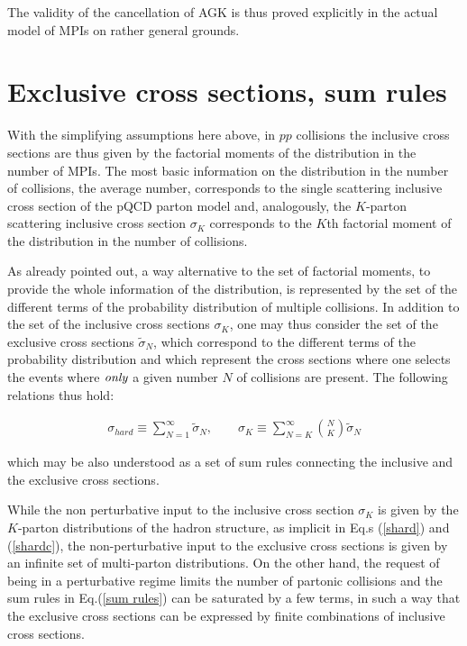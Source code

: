 \documentclass{ws-rv9x6}
\begin{document}
The validity of the cancellation of AGK\cite{Abramovsky:1973fm} is thus proved explicitly in the actual model of MPIs on rather general grounds.

\section{Exclusive cross sections, sum rules}

With the simplifying assumptions here above, in $pp$ collisions the inclusive cross sections are thus given by the factorial moments of the
distribution in the number of MPIs. The most basic information on the distribution in the number of collisions, the average number, corresponds to the
single scattering inclusive cross section of the pQCD parton model and, analogously, the $K$-parton scattering inclusive cross
section $\sigma_K$ corresponds to the $K$th factorial moment of the distribution in the number
of collisions. 

As already pointed out, a way alternative to the set of factorial moments, to provide the whole
information of the distribution, is represented by the set of the
different terms of the probability distribution of multiple
collisions. In addition to the set of the
inclusive cross sections $\sigma_K$, one may thus consider the set of the
exclusive cross sections $\tilde\sigma_N$, which correspond to the different terms of the probability distribution and which represent the cross sections where one selects the events where $\it only$ a given number $N$ of collisions are present\cite{Calucci:2009sv, Seymour:2013sya}. The following relations thus hold:

\begin{eqnarray}\label{sum rules}
\sigma_{hard}\equiv\sum_{N=1}^{\infty}\tilde\sigma_N,\qquad\sigma_K\equiv\sum_{N=K}^{\infty}\binom{N}{K}\tilde\sigma_N
\end{eqnarray}

\noindent which may be also understood as a set of sum rules connecting the inclusive and the exclusive cross sections.

While the non perturbative input to the inclusive cross section $\sigma_K$ is given by the $K$-parton distributions of the hadron structure, as implicit in Eq.s (\ref{shard}) and (\ref{shardc}), the non-perturbative input to the exclusive cross sections is given by an infinite set of multi-parton distributions. On the other hand, the request of being in a perturbative regime limits the number of partonic collisions and the sum rules in Eq.(\ref{sum rules}) can be saturated by a few terms, in such a way that the exclusive cross sections can be expressed by finite combinations of inclusive cross sections. 
\end{document}
